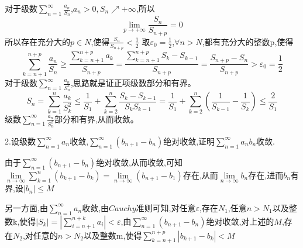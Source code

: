 \documentclass{ctexart}
\begin{document}
\begin{tcolorbox}[title = {综合性问题},colbacktitle=red!25!white,colback=white,arc = 2mm, outer arc = 2mm,fonttitle = \itshape, fontupper = \itshape, fontlower = \itshape]
		\begin{tcolorbox}[colback=white,arc = 1mm, outer arc = 1mm,fonttitle = \itshape, fontupper = \itshape, fontlower = \itshape]
			对于级数$\displaystyle{\sum_{n=1}^{\infty}\frac{a_{n}}{S_{n}}}$,$a_{n} >0,S_{n} \nearrow +\infty$,所以$$\lim_{p \rightarrow +\infty}\frac{S_{n}}{S_{n+p}}=0$$所以存在充分大的$p \in N$,使得$\displaystyle{\frac{S_{n}}{S_{n+p}} < \frac{1}{2}}$
			取$\displaystyle{\varepsilon_{0}=\frac{1}{2}}$,$\forall n> N$,都有充分大的整数p,使得
			$$\sum_{k=n+1}^{n+p}\frac{a_{n}}{S_{n}}\ge \frac{\sum\limits_{k=n+1}^{n+p}a_{k}}{S_{n+p}}=\frac{\sum\limits_{k=n+1}^{n+p}S_{k}-S_{k-1}}{S_{n+p}}=\frac{S_{n+p}-S_{n}}{S_{n+p}} >\varepsilon_{0}=\frac{1}{2}$$
	      \tcblower
		对于级数$\displaystyle{\sum_{n=1}^{\infty}\frac{a_{n}}{S_{n}^{2}}}$,思路就是证正项级数部分和有界。
		$$S_{n}=\sum_{k=1}^{n}\frac{a_{k}}{S_{k}^{2}} \le \frac{1}{S_{1}} + \sum_{k=2}^{n}\frac{S_{k}-S_{k-1}}{S_{k}S_{k-1}}=\frac{1}{S_{1}}+\sum_{k=2}^{n}\left(\frac{1}{S_{k-1}}-\frac{1}{S_{k}}\right) \le \frac{2}{S_{1}} $$
		级数$\displaystyle{\sum_{n=1}^{\infty}\frac{a_{n}}{S_{n}^{2}}}$部分和有界,从而收敛。
		
	\end{tcolorbox}
2.设级数$\displaystyle{\sum_{n=1}^{\infty}a_{n}}$收敛,$\displaystyle{\sum_{n=1}^{\infty}\left(b_{n+1}-b_{n} \right)}$绝对收敛,证明$\displaystyle{\sum_{n=1}^{\infty}a_{n}b_{n}}$收敛.\\
\begin{tcolorbox}[colback=white,arc = 1mm, outer arc = 1mm,fonttitle = \itshape, fontupper = \itshape, fontlower = \itshape]
   由于$\displaystyle{\sum_{n=1}^{\infty}\left(b_{n+1}-b_{n} \right)}$绝对收敛,从而收敛,可知$\lim\limits_{n \rightarrow \infty}\sum\limits_{k=1}^{n}(b_{k+1}-b_{k})=\lim\limits_{n \rightarrow \infty}(b_{n+1}-b_{1})$存在,从而$\lim\limits_{n \rightarrow \infty}b_{n}$存在,进而$b_{n}$有界,设$\left|b_{n}\right| \le M$
   
   另一方面,由$\displaystyle{\sum_{n=1}^{\infty}a_{n}}$收敛,由$Cauchy$准则可知,对任意$\varepsilon$,存在$N_{1}$,任意$n>N_{1}$以及整数k,使得$\left|S_{k}\right|=\left|\sum\limits_{i=n+1}^{n+k}a_{i}\right| < \varepsilon$,由$\displaystyle{\sum_{n=1}^{\infty}\left(b_{n+1}-b_{n} \right)}$绝对收敛,对上述的$M$,存在$N_{2}$,对任意的$n > N_{2}$以及整数m,使得$\sum\limits_{k=n+1}^{n+p}\left|b_{k+1}-b_{k}\right|<M$
   

\end{tcolorbox}
\end{tcolorbox}
\end{document}
